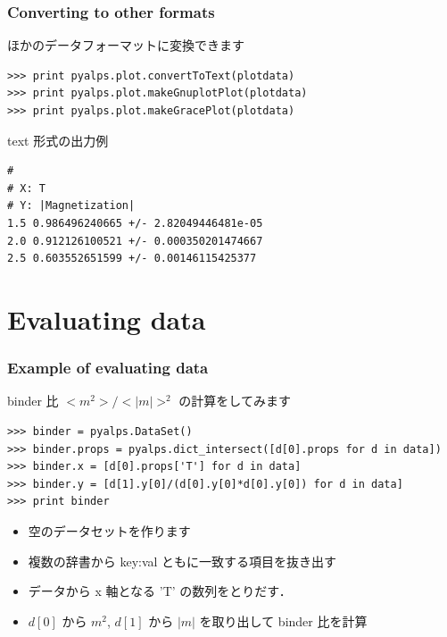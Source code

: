 \begin{frame}[t,fragile]
\frametitle{Converting to other formats}
ほかのデータフォーマットに変換できます
\begin{lstlisting}
>>> print pyalps.plot.convertToText(plotdata)
>>> print pyalps.plot.makeGnuplotPlot(plotdata)
>>> print pyalps.plot.makeGracePlot(plotdata)
\end{lstlisting}

text 形式の出力例
\begin{lstlisting}
# 
# X: T
# Y: |Magnetization|
1.5	0.986496240665 +/- 2.82049446481e-05
2.0	0.912126100521 +/- 0.000350201474667
2.5	0.603552651599 +/- 0.00146115425377
\end{lstlisting}

\end{frame}

\section{Evaluating data}
\begin{frame}[t,fragile]
\frametitle{Example of evaluating data}
binder 比 $<m^2>/<|m|>^2$ の計算をしてみます
\begin{lstlisting}
>>> binder = pyalps.DataSet()
>>> binder.props = pyalps.dict_intersect([d[0].props for d in data])
>>> binder.x = [d[0].props['T'] for d in data]
>>> binder.y = [d[1].y[0]/(d[0].y[0]*d[0].y[0]) for d in data]
>>> print binder
\end{lstlisting}
\begin{itemize}
\item 空のデータセットを作ります
\item 複数の辞書から key:val ともに一致する項目を抜き出す
\item データから x 軸となる 'T' の数列をとりだす．
\item $d[0]$ から $m^2$, $d[1]$ から $|m|$ を取り出して binder 比を計算
\end{itemize}
\end{frame}


